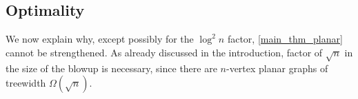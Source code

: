 \documentclass{patmorin}
\newcommand{\david}[1]{{\color{orange} David: #1}}
\newcommand{\pat}[1]{\textcolor{Blue}{Pat: #1}}
\DeclareMathOperator{\polylog}{polylog}
\begin{document}
\subsection{Optimality}

We now explain why, except possibly for the $\log^2 n$ factor, \cref{main_thm_planar} cannot be strengthened.  As already discussed in the introduction, factor of $\sqrt{n}$ in the size of the blowup is necessary, since there are $n$-vertex planar graphs of treewidth $\Omega(\sqrt{n})$.



\end{document}
